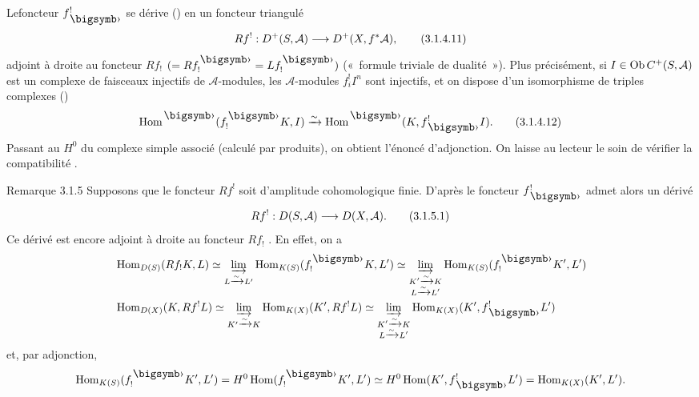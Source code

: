 \documentclass[10pt]{../fichiers-configuration-latex/smfart}
\begin{document}
Le\pageoriginale foncteur $f^{!}_{\bigdot}$ se dérive
() en un foncteur triangulé
\begin{equation*}
Rf^{!}:D^{+}(S,\mathcal{A})\longrightarrow
D^{+}(X,f^{\ast}\mathcal{A}){},\tag{3.1.4.11}
\end{equation*}%
adjoint à droite au foncteur $Rf_{!}$
$(=Rf^{\bigdot}_{!}=Lf^{\bigdot}_{!})$ (« formule triviale de
dualité »). Plus précisément, si $I\in \operatorname{Ob} C^{+}(S,\mathcal{A})$
est un complexe de faisceaux injectifs de $\mathcal{A}$-modules, les
$\mathcal{A}$-modules $f^{!}_{i} I^{n}$ sont injectifs, et on dispose
d'un isomorphisme de triples complexes ()
\begin{equation*}
\Hom^{\bigdot}(f^{\bigdot}_{!}K, I)\xrightarrow{\sim}
\Hom^{\bigdot}(K,f^{!}_{\bigdot}I){\quoi}.\tag{3.1.4.12}
\end{equation*}%
Passant au $H^{0}$ du complexe simple associé (calculé par produits),
on obtient l'énoncé d'adjonction. On laisse au lecteur le soin de
vérifier la compatibilité .

\begin{enonce*}[remark]{Remarque 3.1.5}
Supposons que le foncteur $Rf^{!}$ soit d'amplitude cohomologique
finie. D'après  le foncteur $f^{!}_{\bigdot}$ admet alors
un dérivé
\begin{equation*}
Rf^{!}:D(S,\mathcal{A})\longrightarrow D(X,\mathcal{A}){}.\tag{3.1.5.1}
\end{equation*}%
Ce dérivé est encore adjoint à droite au foncteur $Rf_{!}$
. En effet, on a
\begin{align*}
& \Hom_{D(S)}(Rf_{!}K,L)\simeq
\varinjlim_{L\xrightarrow{\sim}L'}\Hom_{K(S)}(f^{\bigdot}_{!}K,L')\simeq
\varinjlim_{\substack{K'\xrightarrow{\sim}K\\ L\xrightarrow{\sim}
L'}}\Hom_{K(S)} (f^{\bigdot}_{!}K', L')\\
& \Hom_{D(X)}(K,Rf^{!}L)\simeq
\varinjlim_{K'\xrightarrow{\sim}K}\Hom_{K(X)}(K',Rf^{!}L)\simeq
\varinjlim_{\substack{K'\xrightarrow{\sim}K\\
L\xrightarrow{\sim}L'}}\Hom_{K(X)}(K', f^{!}_{\bigdot}L')
\end{align*}
et, par adjonction,
$$
\Hom_{K(S)}(f^{\bigdot}_{!}K',L')=H^{0}\Hom(f^{\bigdot}_{!}K',L')\simeq
H^{0}\Hom(K',f^{!}_{\bigdot}L')=\Hom_{K(X)}(K',L'){\quoi}.
$$
\end{enonce*}
\end{document}
